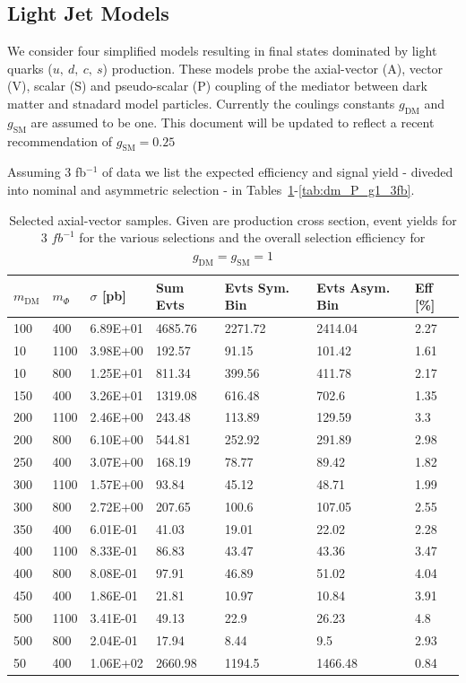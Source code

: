 \subsection{Light Jet Models}


We consider four simplified models resulting in final states dominated by light quarks ($u,~d,~c,~s$) production. These models probe the axial-vector (A), vector (V), scalar (S) and pseudo-scalar (P) coupling of the mediator between dark matter and stnadard model particles. Currently the coulings constants $g_\textrm{DM}$ and $g_\textrm{SM}$ are assumed to be one. This document will be updated to reflect a recent recommendation of $g_\textrm{SM}=0.25$

Assuming 3 fb$^{-1}$ of data we list the expected efficiency and signal yield - diveded into nominal and asymmetric selection - in Tables~\ref{tab:dm_A_g1_3fb}-\ref{tab:dm_P_g1_3fb}.

\begin{table}[h]
\centering
\begin{tabular}{lllllll}
\hline
$m_\textrm{DM}$ & $m_\Phi$  & $\sigma$ [pb] & Sum Evts       & Evts Sym. Bin & Evts Asym. Bin & Eff  [\%]   \\\hline
100   &  400  & 6.89E+01 & 4685.76 & 2271.72 & 2414.04 & 2.27 \\
10   &  1100  & 3.98E+00 & 192.57  & 91.15   & 101.42  & 1.61 \\
10   &  800   & 1.25E+01 & 811.34  & 399.56  & 411.78  & 2.17 \\
150   &  400  & 3.26E+01 & 1319.08 & 616.48  & 702.6   & 1.35 \\
200   &  1100 & 2.46E+00 & 243.48  & 113.89  & 129.59  & 3.3  \\
200   &  800  & 6.10E+00 & 544.81  & 252.92  & 291.89  & 2.98 \\
250   &  400  & 3.07E+00 & 168.19  & 78.77   & 89.42   & 1.82 \\
300   &  1100 & 1.57E+00 & 93.84   & 45.12   & 48.71   & 1.99 \\
300   &  800  & 2.72E+00 & 207.65  & 100.6   & 107.05  & 2.55 \\
350   &  400  & 6.01E-01 & 41.03   & 19.01   & 22.02   & 2.28 \\
400   &  1100 & 8.33E-01 & 86.83   & 43.47   & 43.36   & 3.47 \\
400   &  800  & 8.08E-01 & 97.91   & 46.89   & 51.02   & 4.04 \\
450   &  400  & 1.86E-01 & 21.81   & 10.97   & 10.84   & 3.91 \\
500   &  1100 & 3.41E-01 & 49.13   & 22.9    & 26.23   & 4.8  \\
500   &  800  & 2.04E-01 & 17.94   & 8.44    & 9.5     & 2.93 \\
50   &  400   & 1.06E+02 & 2660.98 & 1194.5  & 1466.48 & 0.84\\
\hline
\hline
\end{tabular}
\caption{Selected axial-vector samples. Given are production cross section, event yields for 3 $fb^{-1 }$ for the various selections and the overall selection efficiency for $g_\textrm{DM}=g_\textrm{SM}=1$}
\label{tab:dm_A_g1_3fb}
\end{table}


